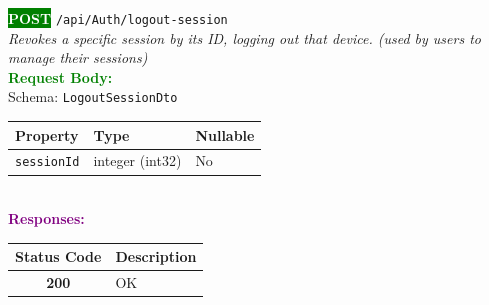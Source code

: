 \begin{tcolorbox}[
    colback=green!5,
    colframe=green,
    arc=2mm,
    boxrule=1pt,
    left=5pt,
    right=5pt,
    top=5pt,
    bottom=5pt
]
\noindent\colorbox{green}{\textcolor{white}{\textbf{POST}}} 
\texttt{\large /api/Auth/logout-session}\\[0.3em]
\textit{Revokes a specific session by its ID, logging out that device. (used by users to manage their sessions)}\\[0.3em]
\vspace{0.3em}
\textbf{\textcolor{green}{Request Body:}}\\[0.2em]
Schema: \texttt{LogoutSessionDto}\\[0.3em]
\begin{tabular}{|l|l|l|}
\hline
\rowcolor{green!10}
\textbf{Property} & \textbf{Type} & \textbf{Nullable} \\ \hline
\texttt{sessionId} & integer (int32) & No \\ \hline
\end{tabular}\\[0.5em]
\vspace{0.3em}
\textbf{\textcolor{purple}{Responses:}}\\[0.2em]
\begin{tabular}{|c|p{10cm}|}
\hline
\rowcolor{gray!20}
\textbf{Status Code} & \textbf{Description} \\ \hline
\colorbox{green!20}{\textbf{200}} & OK \\ \hline
\end{tabular}
\end{tcolorbox}
\vspace{0.5em}

